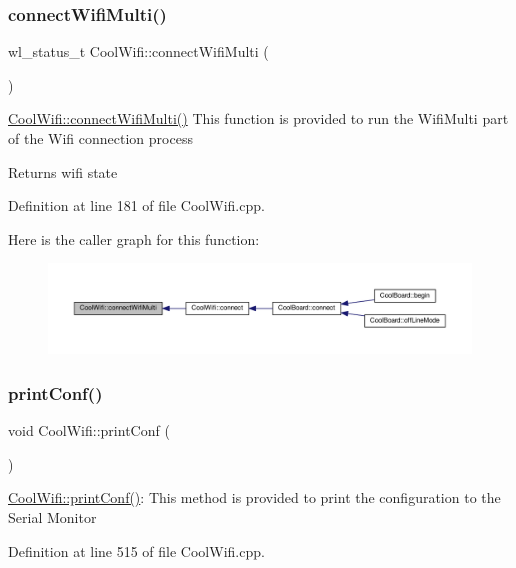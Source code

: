 \subsubsection{\texorpdfstring{connect\+Wifi\+Multi()}{connectWifiMulti()}}
{\footnotesize\ttfamily wl\+\_\+status\+\_\+t Cool\+Wifi\+::connect\+Wifi\+Multi (\begin{DoxyParamCaption}{ }\end{DoxyParamCaption})}

\hyperlink{class_cool_wifi_a419de92d738f14b7444cf822b3ab0070}{Cool\+Wifi\+::connect\+Wifi\+Multi()} This function is provided to run the Wifi\+Multi part of the Wifi connection process

\begin{DoxyReturn}{Returns}
wifi state 
\end{DoxyReturn}


Definition at line 181 of file Cool\+Wifi.\+cpp.

Here is the caller graph for this function\+:
\nopagebreak
\begin{figure}[H]
\begin{center}
\leavevmode
\includegraphics[width=350pt]{class_cool_wifi_a419de92d738f14b7444cf822b3ab0070_icgraph}
\end{center}
\end{figure}
\mbox{\label{class_cool_wifi_a9e6105c6d13d35ec510f6633da9e0223}} 
\subsubsection{\texorpdfstring{print\+Conf()}{printConf()}}
{\footnotesize\ttfamily void Cool\+Wifi\+::print\+Conf (\begin{DoxyParamCaption}{ }\end{DoxyParamCaption})}

\hyperlink{class_cool_wifi_a9e6105c6d13d35ec510f6633da9e0223}{Cool\+Wifi\+::print\+Conf()}\+: This method is provided to print the configuration to the Serial Monitor 

Definition at line 515 of file Cool\+Wifi.\+cpp.

